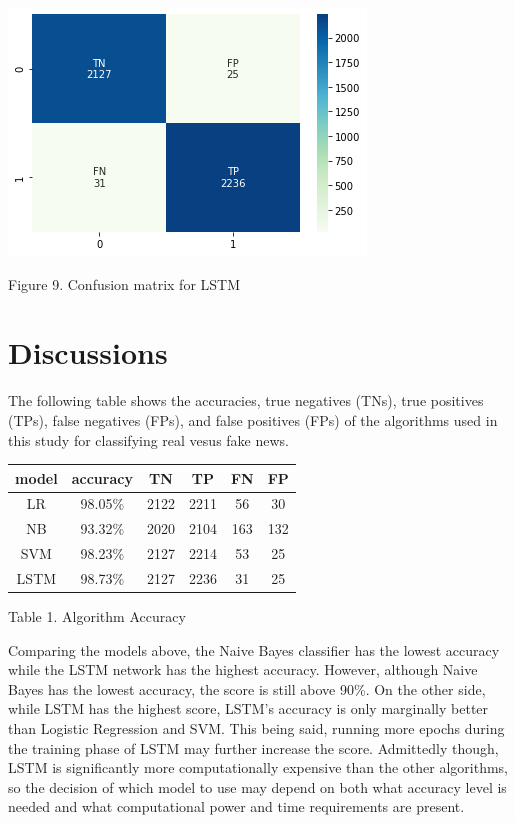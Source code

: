 \documentclass{article}
\begin{document}
\begin{multicols}{2}
\begin{center}
\includegraphics[scale=0.45]{images/lstmcm.png}
\newline
\caption{Figure 9. Confusion matrix for LSTM}
\end{center}

\section{Discussions}

The following table shows the accuracies, true negatives (TNs), true positives (TPs), false negatives (FPs), and false positives (FPs) of the algorithms used in this study for classifying real vesus fake news. 

\begin{center}
\begin{tabular}{ c| c c c c c}
 model & accuracy & TN & TP & FN & FP \\ 
\hline
LR & 98.05\% & 2122  & 2211 & 56 & 30\\ 
NB & 93.32\% & 2020 & 2104 & 163 & 132\\
SVM & 98.23\% & 2127 & 2214 & 53 & 25\\
LSTM & 98.73\% & 2127 & 2236 & 31 & 25 \\
\end{tabular}
\caption{Table 1. Algorithm Accuracy}
\newline
\end{center}

Comparing the models above, the Naive Bayes classifier has the lowest accuracy while the LSTM network has the highest accuracy. However, although Naive Bayes has the lowest accuracy, the score is still above 90\%. On the other side, while LSTM has the highest score, LSTM's accuracy is only marginally better than Logistic Regression and SVM. This being said, running more epochs during the training phase of LSTM may further increase the score. Admittedly though, LSTM is significantly more computationally expensive than the other algorithms, so the decision of which model to use may depend on both what accuracy level is needed and what computational power and time requirements are present. 


\end{multicols}
\end{document}
